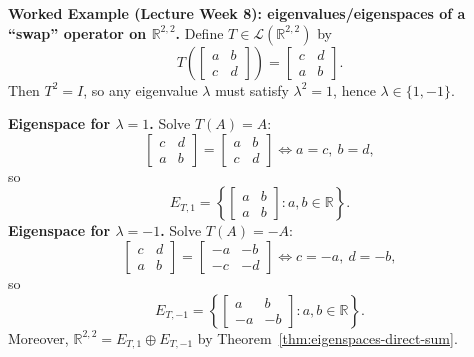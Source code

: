\begin{examplebox}
\textbf{Worked Example (Lecture Week 8): eigenvalues/eigenspaces of a ``swap'' operator on $\mathbb{R}^{2,2}$.}
Define $T\in\mathcal{L}(\mathbb{R}^{2,2})$ by
\[
T\!\left(\begin{bmatrix}a&b\\c&d\end{bmatrix}\right)=
\begin{bmatrix}c&d\\a&b\end{bmatrix}.
\]
Then $T^2=I$, so any eigenvalue $\lambda$ must satisfy $\lambda^2=1$, hence $\lambda\in\{1,-1\}$.

\textbf{Eigenspace for $\lambda=1$.} Solve $T(A)=A$:
\[
\begin{bmatrix}c&d\\a&b\end{bmatrix}=\begin{bmatrix}a&b\\c&d\end{bmatrix}
\Longleftrightarrow a=c,\ b=d,
\]
so
\[
E_{T,1}=\left\{\begin{bmatrix}a&b\\a&b\end{bmatrix}:a,b\in\mathbb{R}\right\}.
\]
\textbf{Eigenspace for $\lambda=-1$.} Solve $T(A)=-A$:
\[
\begin{bmatrix}c&d\\a&b\end{bmatrix}=\begin{bmatrix}-a&-b\\-c&-d\end{bmatrix}
\Longleftrightarrow c=-a,\ d=-b,
\]
so
\[
E_{T,-1}=\left\{\begin{bmatrix}a&b\\-a&-b\end{bmatrix}:a,b\in\mathbb{R}\right\}.
\]
Moreover, $\mathbb{R}^{2,2}=E_{T,1}\oplus E_{T,-1}$ by Theorem~\ref{thm:eigenspaces-direct-sum}.
\end{examplebox}

